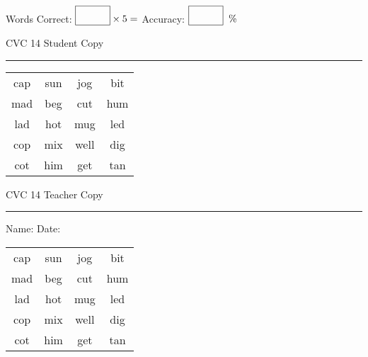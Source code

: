 \documentclass{memoir}
\begin{document}
\normalsize

Words Correct: $\fbox{\phantom{\huge 100}} \times 5 = $ Accuracy: $\fbox{\phantom{\huge 100}}\;\; \%$ 

\vfill

\newpage


\footnotesize \noindent
CVC 14 \hfill Student Copy
\smallskip
\hrule

\huge

\setlength{\tabcolsep}{14pt}
\def\arraystretch{2}

{\selectfont


\begin{vplace}[0.5]
\begin{center}
\begin{tabular}{cccc}
cap & sun & jog & bit \\
mad & beg & cut & hum \\
lad & hot & mug & led \\
cop & mix & well & dig \\
cot & him & get & tan \\
\end{tabular}
\end{center}
\end{vplace}

}

\newpage

\footnotesize \noindent
CVC 14 \hfill Teacher Copy
\smallskip
\hrule

\normalsize

\vfill

\noindent
Name: \underline{\hspace{1.75in}} \hfill Date: \underline{\hspace{1in}}

\huge

{\selectfont


\begin{vplace}[0.5]
\begin{center}
\begin{tabular}{cccc}
cap & sun & jog & bit \\
mad & beg & cut & hum \\
lad & hot & mug & led \\
cop & mix & well & dig \\
cot & him & get & tan \\
\end{tabular}
\end{center}
\end{vplace}



}
\end{document}
